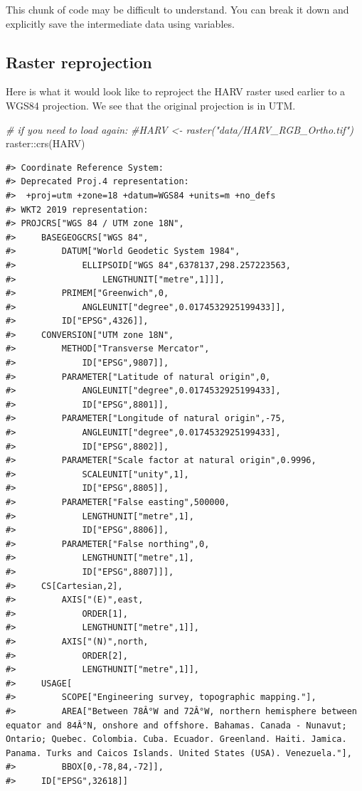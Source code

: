 \documentclass[
  11pt,
]{book}
\newenvironment{Shaded}{\begin{snugshade}}{\end{snugshade}}
\newcommand{\CommentTok}[1]{\textcolor[rgb]{0.56,0.35,0.01}{\textit{#1}}}
\newcommand{\FunctionTok}[1]{\textcolor[rgb]{0.00,0.00,0.00}{#1}}
\newcommand{\NormalTok}[1]{#1}
\newcommand{\SpecialCharTok}[1]{\textcolor[rgb]{0.00,0.00,0.00}{#1}}
\begin{document}
This chunk of code may be difficult to understand. You can break it down and explicitly save the intermediate data using variables.

\hypertarget{raster-reprojection}{%
\subsection{Raster reprojection}\label{raster-reprojection}}

Here is what it would look like to reproject the HARV raster used earlier to a WGS84 projection. We see that the original projection is in UTM.

\begin{Shaded}
\begin{Highlighting}[]
\CommentTok{\# if you need to load again:}
\CommentTok{\#HARV \textless{}{-} raster("data/HARV\_RGB\_Ortho.tif")}
\NormalTok{raster}\SpecialCharTok{::}\FunctionTok{crs}\NormalTok{(HARV)}
\end{Highlighting}
\end{Shaded}

\begin{verbatim}
#> Coordinate Reference System:
#> Deprecated Proj.4 representation:
#>  +proj=utm +zone=18 +datum=WGS84 +units=m +no_defs 
#> WKT2 2019 representation:
#> PROJCRS["WGS 84 / UTM zone 18N",
#>     BASEGEOGCRS["WGS 84",
#>         DATUM["World Geodetic System 1984",
#>             ELLIPSOID["WGS 84",6378137,298.257223563,
#>                 LENGTHUNIT["metre",1]]],
#>         PRIMEM["Greenwich",0,
#>             ANGLEUNIT["degree",0.0174532925199433]],
#>         ID["EPSG",4326]],
#>     CONVERSION["UTM zone 18N",
#>         METHOD["Transverse Mercator",
#>             ID["EPSG",9807]],
#>         PARAMETER["Latitude of natural origin",0,
#>             ANGLEUNIT["degree",0.0174532925199433],
#>             ID["EPSG",8801]],
#>         PARAMETER["Longitude of natural origin",-75,
#>             ANGLEUNIT["degree",0.0174532925199433],
#>             ID["EPSG",8802]],
#>         PARAMETER["Scale factor at natural origin",0.9996,
#>             SCALEUNIT["unity",1],
#>             ID["EPSG",8805]],
#>         PARAMETER["False easting",500000,
#>             LENGTHUNIT["metre",1],
#>             ID["EPSG",8806]],
#>         PARAMETER["False northing",0,
#>             LENGTHUNIT["metre",1],
#>             ID["EPSG",8807]]],
#>     CS[Cartesian,2],
#>         AXIS["(E)",east,
#>             ORDER[1],
#>             LENGTHUNIT["metre",1]],
#>         AXIS["(N)",north,
#>             ORDER[2],
#>             LENGTHUNIT["metre",1]],
#>     USAGE[
#>         SCOPE["Engineering survey, topographic mapping."],
#>         AREA["Between 78Â°W and 72Â°W, northern hemisphere between equator and 84Â°N, onshore and offshore. Bahamas. Canada - Nunavut; Ontario; Quebec. Colombia. Cuba. Ecuador. Greenland. Haiti. Jamica. Panama. Turks and Caicos Islands. United States (USA). Venezuela."],
#>         BBOX[0,-78,84,-72]],
#>     ID["EPSG",32618]]
\end{verbatim}
\end{document}
